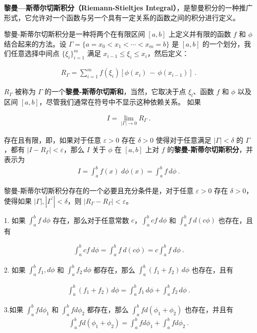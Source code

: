 
\textbf{黎曼—斯蒂尔切斯积分（Riemann-Stieltjes Integral）}，是黎曼积分的一种推广形式，它允许对一个函数与另一个具有一定关系的函数之间的积分进行定义。

黎曼-斯蒂尔切斯积分是一种将两个在有限区间 $ [a, b] $ 上定义并有限的函数 $ f $ 和 $ \phi $ 结合起来的方法。设 $ \Gamma=\{a=x_{0}<x_{1}<\cdots<x_{m}=b\} $ 是 $ [a, b] $ 的一个划分，我们任意选择中间点 $ \{\xi_{i}\}_{i=1}^{m} $ 满足 $ x_{i-1}\leq\xi_{i}\leq x_{i} $，然后定义：

\begin{align}
R_{\Gamma}=\sum_{i=1}^{m}f(\xi_{i})[\phi(x_{i})\,-\,\phi(x_{i-1})]~.
\end{align}

$ R_{\Gamma} $ 被称为 $ \Gamma $ 的一个\textbf{黎曼-斯蒂尔切斯和}，当然，它取决于点 $ \xi_{l} $、函数 $ f $ 和 $ \phi $ 以及区间 $ [a, b] $，尽管我们通常在符号中不显示这种依赖关系。
如果

\begin{align}
I=\lim_{|\Gamma|\to0}R_{\Gamma}~.
\end{align}

存在且有限，即，如果对于任意 $ \varepsilon>0 $ 存在 $ \delta>0 $ 使得对于任意满足 $ |\Gamma|<\delta $ 的 $ \Gamma $，都有 $ |I-R_{\Gamma}|<\varepsilon $，那么 $ I $ 关于 $ \phi $ 在 $ [a, b] $ 上对 $ f $ 的\textbf{黎曼-斯蒂尔切斯积分}，并表示为
\begin{align}
I=\int_{a}^{b}\!f(x)\;d\phi(x)=\int_{a}^{b}\!f\,d\phi~.
\end{align}

黎曼-斯蒂尔切斯积分存在的一个必要且充分条件是，对于任意 $ \varepsilon>0 $ 存在 $ \delta>0 $，使得如果 $ |\Gamma|,|\Gamma^{\prime}|<\delta $，则 $ |R_{\Gamma}-R_{\Gamma}|<\varepsilon $。

\begin{theorem}{}
1. 如果 $\int_{a}^{b}f\ d\phi$ 存在，那么对于任意常数 $c$，$\int_{a}^{b}cf\ d\phi$ 和 $\int_{a}^{b}f\ d(c\phi)$ 也存在，且有

\begin{align} \int_{a}^{b}cf\ d\phi=\int_{a}^{b}f\ d(c\phi)=c\int_{a}^{b}f\ d\phi~. \end{align}

2.
如果 $\int_{a}^{b}f_{1},d\phi$ 和 $\int_{a}^{b}f_{2}\,d\phi$ 都存在，那么 $\int_{a}^{b}(f_{1}+f_{2})\,d\phi$ 也存在，且有

\begin{align} \int_{a}^{b}(f_{1}+f_{2})\,d\phi=\int_{a}^{b}f_{1}\,d\phi+\int_{a}^{b}f_{2}\,d\phi~. \end{align}

3.如果 $ \int_{a}^{b}fd\phi_{1} $ 和 $ \int_{a}^{b}fd\phi_{2} $ 都存在，那么 $ \int_{a}^{b}fd(\phi_{1}+\phi_{2}) $ 也存在，并且有 \begin{align} \int_{a}^{b}fd(\phi_{1}+\phi_{2})=\int_{a}^{b}fd\phi_{1}+\int_{a}^{b}fd\phi_{2}~. \end{align}
\end{theorem}

